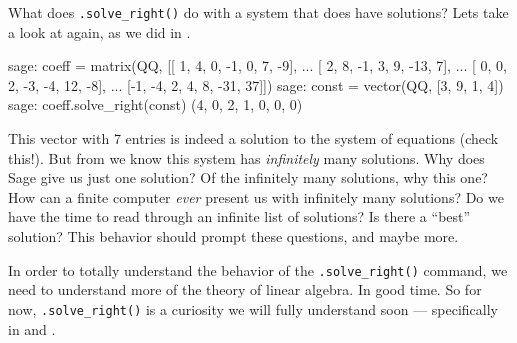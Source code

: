 %
What does \verb?.solve_right()? do with a system that does have solutions?  Lets take a look at  again, as we did in .
%
\begin{sageexample}
sage: coeff = matrix(QQ, [[ 1,  4,  0, -1,  0,   7, -9],
...                       [ 2,  8, -1,  3,  9, -13,  7],
...                       [ 0,  0,  2, -3, -4,  12, -8],
...                       [-1, -4,  2,  4,  8, -31, 37]])
sage: const = vector(QQ, [3, 9, 1, 4])
sage: coeff.solve_right(const)
(4, 0, 2, 1, 0, 0, 0)
\end{sageexample}
%
This vector with 7 entries is indeed a solution to the system of equations (check this!).  But from  we know this system has \emph{infinitely} many solutions.  Why does Sage give us just one solution?  Of the infinitely many solutions, why this one?  How can a finite computer \emph{ever} present us with infinitely many solutions?  Do we have the time to read through an infinite list of solutions?  Is there a ``best'' solution?  This behavior should prompt these questions, and maybe more.\par
%
In order to totally understand the behavior of the \verb?.solve_right()? command, we need to understand more of the theory of linear algebra.  In good time.  So for now, \verb?.solve_right()? is a curiosity we will fully understand soon --- specifically in  and .
%
\begin{sageverbatim}
\end{sageverbatim}
%